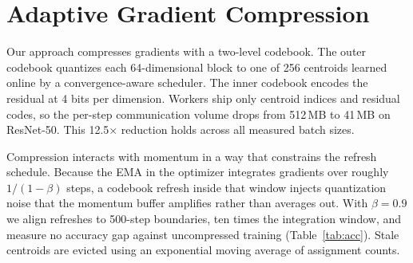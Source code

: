 \section{Adaptive Gradient Compression}\label{sec:method}

Our approach compresses gradients with a two-level codebook. The outer codebook
quantizes each 64-dimensional block to one of 256 centroids learned online by a
convergence-aware scheduler. The inner codebook encodes the residual at 4 bits
per dimension. Workers ship only centroid indices and residual codes, so the
per-step communication volume drops from 512\,MB to 41\,MB on ResNet-50. This
12.5$\times$ reduction holds across all measured batch sizes.

Compression interacts with momentum in a way that constrains the refresh
schedule. Because the EMA in the optimizer integrates gradients over roughly
$1/(1-\beta)$ steps, a codebook refresh inside that window injects quantization
noise that the momentum buffer amplifies rather than averages out. With
$\beta=0.9$ we align refreshes to 500-step boundaries, ten times the
integration window, and measure no accuracy gap against uncompressed
training (Table~\ref{tab:acc}). Stale centroids are evicted using an
exponential moving average of assignment counts.
